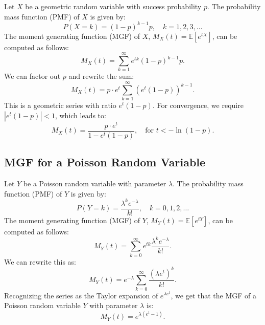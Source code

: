     Let \( X \) be a geometric random variable with success probability \( p \). The probability mass function (PMF) of \( X \) is given by:
    \[
    P(X = k) = (1 - p)^{k - 1} p, \quad k = 1, 2, 3, \dots
    \]
    The moment generating function (MGF) of \( X \), \( M_X(t) = \mathbb{E}[e^{tX}] \), can be computed as follows:
    \[
    M_X(t) = \sum_{k=1}^{\infty} e^{tk} (1 - p)^{k - 1} p.
    \]
    We can factor out \( p \) and rewrite the sum:
    \[
    M_X(t) = p\cdot e^t\sum_{k=1}^{\infty} \left( e^t (1 - p) \right)^{k - 1}.
    \]
    This is a geometric series with ratio \( e^t (1 - p) \). For convergence, we require \( |e^t (1 - p)| < 1 \), which leads to:
    \[
    M_X(t) = \frac{p \cdot e^t}{1 - e^t (1 - p)}, \quad \text{for } t < -\ln(1 - p).
    \]
    
    \subsection{MGF for a Poisson Random Variable}
    
    Let \( Y \) be a Poisson random variable with parameter \( \lambda \). The probability mass function (PMF) of \( Y \) is given by:
    \[
    P(Y = k) = \frac{\lambda^k e^{-\lambda}}{k!}, \quad k = 0, 1, 2, \dots
    \]
    The moment generating function (MGF) of \( Y \), \( M_Y(t) = \mathbb{E}[e^{tY}] \), can be computed as follows:
    \[
    M_Y(t) = \sum_{k=0}^{\infty} e^{tk} \frac{\lambda^k e^{-\lambda}}{k!}.
    \]
    We can rewrite this as:
    \[
    M_Y(t) = e^{-\lambda} \sum_{k=0}^{\infty} \frac{(\lambda e^t)^k}{k!}.
    \]
    Recognizing the series as the Taylor expansion of \( e^{\lambda e^t} \), we get that the MGF of a Poisson random variable \( Y \) with parameter \( \lambda \) is:
    \[
    M_Y(t) = e^{\lambda (e^t - 1)}.
    \]
